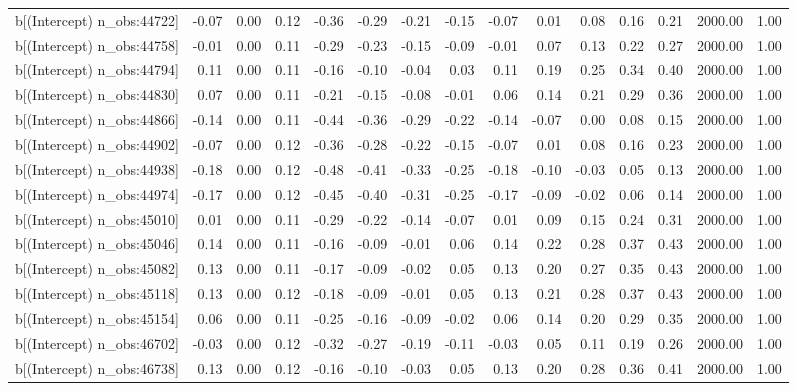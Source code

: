 \begin{table}[ht]
\begin{tabular}{rrrrrrrrrrrrrrr}
  b[(Intercept) n\_obs:44722] & -0.07 & 0.00 & 0.12 & -0.36 & -0.29 & -0.21 & -0.15 & -0.07 & 0.01 & 0.08 & 0.16 & 0.21 & 2000.00 & 1.00 \\ 
  b[(Intercept) n\_obs:44758] & -0.01 & 0.00 & 0.11 & -0.29 & -0.23 & -0.15 & -0.09 & -0.01 & 0.07 & 0.13 & 0.22 & 0.27 & 2000.00 & 1.00 \\ 
  b[(Intercept) n\_obs:44794] & 0.11 & 0.00 & 0.11 & -0.16 & -0.10 & -0.04 & 0.03 & 0.11 & 0.19 & 0.25 & 0.34 & 0.40 & 2000.00 & 1.00 \\ 
  b[(Intercept) n\_obs:44830] & 0.07 & 0.00 & 0.11 & -0.21 & -0.15 & -0.08 & -0.01 & 0.06 & 0.14 & 0.21 & 0.29 & 0.36 & 2000.00 & 1.00 \\ 
  b[(Intercept) n\_obs:44866] & -0.14 & 0.00 & 0.11 & -0.44 & -0.36 & -0.29 & -0.22 & -0.14 & -0.07 & 0.00 & 0.08 & 0.15 & 2000.00 & 1.00 \\ 
  b[(Intercept) n\_obs:44902] & -0.07 & 0.00 & 0.12 & -0.36 & -0.28 & -0.22 & -0.15 & -0.07 & 0.01 & 0.08 & 0.16 & 0.23 & 2000.00 & 1.00 \\ 
  b[(Intercept) n\_obs:44938] & -0.18 & 0.00 & 0.12 & -0.48 & -0.41 & -0.33 & -0.25 & -0.18 & -0.10 & -0.03 & 0.05 & 0.13 & 2000.00 & 1.00 \\ 
  b[(Intercept) n\_obs:44974] & -0.17 & 0.00 & 0.12 & -0.45 & -0.40 & -0.31 & -0.25 & -0.17 & -0.09 & -0.02 & 0.06 & 0.14 & 2000.00 & 1.00 \\ 
  b[(Intercept) n\_obs:45010] & 0.01 & 0.00 & 0.11 & -0.29 & -0.22 & -0.14 & -0.07 & 0.01 & 0.09 & 0.15 & 0.24 & 0.31 & 2000.00 & 1.00 \\ 
  b[(Intercept) n\_obs:45046] & 0.14 & 0.00 & 0.11 & -0.16 & -0.09 & -0.01 & 0.06 & 0.14 & 0.22 & 0.28 & 0.37 & 0.43 & 2000.00 & 1.00 \\ 
  b[(Intercept) n\_obs:45082] & 0.13 & 0.00 & 0.11 & -0.17 & -0.09 & -0.02 & 0.05 & 0.13 & 0.20 & 0.27 & 0.35 & 0.43 & 2000.00 & 1.00 \\ 
  b[(Intercept) n\_obs:45118] & 0.13 & 0.00 & 0.12 & -0.18 & -0.09 & -0.01 & 0.05 & 0.13 & 0.21 & 0.28 & 0.37 & 0.43 & 2000.00 & 1.00 \\ 
  b[(Intercept) n\_obs:45154] & 0.06 & 0.00 & 0.11 & -0.25 & -0.16 & -0.09 & -0.02 & 0.06 & 0.14 & 0.20 & 0.29 & 0.35 & 2000.00 & 1.00 \\ 
  b[(Intercept) n\_obs:46702] & -0.03 & 0.00 & 0.12 & -0.32 & -0.27 & -0.19 & -0.11 & -0.03 & 0.05 & 0.11 & 0.19 & 0.26 & 2000.00 & 1.00 \\ 
  b[(Intercept) n\_obs:46738] & 0.13 & 0.00 & 0.12 & -0.16 & -0.10 & -0.03 & 0.05 & 0.13 & 0.20 & 0.28 & 0.36 & 0.41 & 2000.00 & 1.00 \\ 

\end{tabular}
\end{table}
